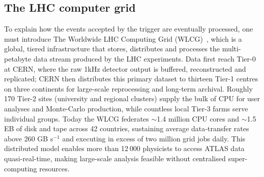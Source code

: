 \subsection{The LHC computer grid}
\label{sec:computer_grid}
To explain how the events accepted by the trigger are eventually processed, one must introduce The Worldwide LHC Computing Grid (WLCG)~\cite{Bird:1695401}, which is a global, tiered infrastructure that stores, distributes and processes the multi-petabyte data stream produced by the LHC experiments.  Data first reach Tier-0 at CERN, where the raw 1kHz detector output is buffered, reconstructed and replicated; CERN then distributes this primary dataset to thirteen Tier-1 centres on three continents for large-scale reprocessing and long-term archival. Roughly 170 Tier-2 sites (university and regional clusters) supply the bulk of CPU for user analyses and Monte-Carlo production, while countless local Tier-3 farms serve individual groups.  
Today the WLCG federates $\sim$1.4 million CPU cores and $\sim$1.5 EB of disk and tape across 42 countries, sustaining average data‐transfer rates above 260 GB s$^{-1}$ and executing in excess of two million grid jobs daily.  This distributed model enables more than 12 000 physicists to access ATLAS data quasi-real-time, making large-scale analysis feasible without centralised super-computing resources.
